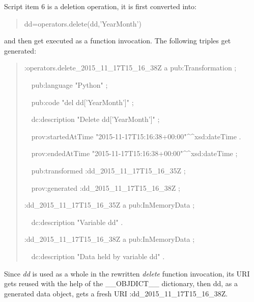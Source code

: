 Script item 6 is a deletion operation, it is first converted into:
\begin{quotation}
	\noindent dd=operators.delete(dd,'YearMonth')
\end{quotation}
and then get executed as a function invocation. The following triples get generated:
\begin{quotation}
	\noindent :operators.delete\_2015\_11\_17T15\_16\_38Z a pub:Transformation ;
	
	\noindent\ \ pub:language "Python" ;
	
	\noindent\ \ pub:code "del dd['YearMonth']" ;
	
	\noindent\ \ dc:description "Delete dd['YearMonth']" ;
	
	\noindent\ \ prov:startedAtTime "2015-11-17T15:16:38+00:00"\^{}\^{}xsd:dateTime .
	
	\noindent\ \ prov:endedAtTime "2015-11-17T15:16:38+00:00"\^{}\^{}xsd:dateTime ;
	
	\noindent\ \ pub:transformed :dd\_2015\_11\_17T15\_16\_35Z ;
	
	\noindent\ \ prov:generated :dd\_2015\_11\_17T15\_16\_38Z ;
	
	\noindent:dd\_2015\_11\_17T15\_16\_35Z a pub:InMemoryData ;

	\noindent\ \ dc:description "Variable dd" .

	\noindent:dd\_2015\_11\_17T15\_16\_38Z a pub:InMemoryData ;
	
	\noindent\ \ dc:description "Data held by variable dd" .
\end{quotation}
Since \emph{dd} is used as a whole in the rewritten \emph{delete} function invocation, its URI gets reused with the help of the \_\_OBJDICT\_\_ dictionary, then dd, as a generated data object, gets a fresh URI :dd\_2015\_11\_17T15\_16\_38Z.

